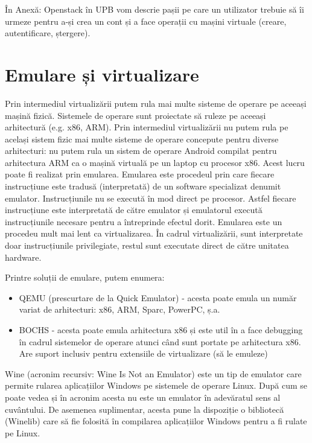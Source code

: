 În Anexă: Openstack în UPB vom descrie pașii pe care un utilizator trebuie să îi
urmeze pentru a-și crea un cont și a face operații cu mașini virtuale (creare,
autentificare, ștergere).

\section{Emulare și virtualizare}
\label{sec:vm-emulation}

Prin intermediul virtualizării putem rula mai multe sisteme de operare pe
aceeași mașină fizică. Sistemele de operare sunt proiectate să ruleze pe aceeași
arhitectură (e.g. x86, ARM). Prin intermediul virtualizării nu putem rula pe
același sistem fizic mai multe sisteme de operare concepute pentru diverse
arhitecturi: nu putem rula un sistem de operare Android compilat pentru
arhitectura ARM ca o mașină virtuală pe un laptop cu procesor x86. Acest lucru
poate fi realizat prin emularea. Emularea este procedeul prin care fiecare
instrucțiune este tradusă (interpretată) de un software specializat denumit
emulator. Instrucțiunile nu se execută în mod direct pe procesor. Astfel fiecare
instrucțiune este interpretată de către emulator și emulatorul execută
instrucțiunile necesare pentru a întreprinde efectul dorit. Emularea este un
procedeu mult mai lent ca virtualizarea. În cadrul virtualizării, sunt
interpretate doar instrucțiunile privilegiate, restul sunt executate direct de
către unitatea hardware.

Printre soluții de emulare, putem enumera:

\begin{itemize}
	\item QEMU  (prescurtare de la Quick
		Emulator) - acesta poate emula un număr variat de arhitecturi:
		x86, ARM, Sparc, PowerPC, ș.a.
	\item BOCHS - acesta poate emula arhitectura x86 și este util în a face
		debugging în cadrul sistemelor de operare atunci când sunt
		portate pe arhitectura x86. Are suport inclusiv pentru
		extensiile de virtualizare (să le emuleze)
\end{itemize}

Wine (acronim recursiv: Wine Is Not an Emulator) este un tip de emulator care
permite rularea aplicațiilor Windows pe sistemele de operare Linux. După cum se
poate vedea și în acronim acesta nu este un emulator în adevăratul sens al
cuvântului. De asemenea suplimentar, acesta pune la dispoziție o bibliotecă
(Winelib) care să fie folosită în compilarea aplicațiilor Windows pentru a fi
rulate pe Linux.


